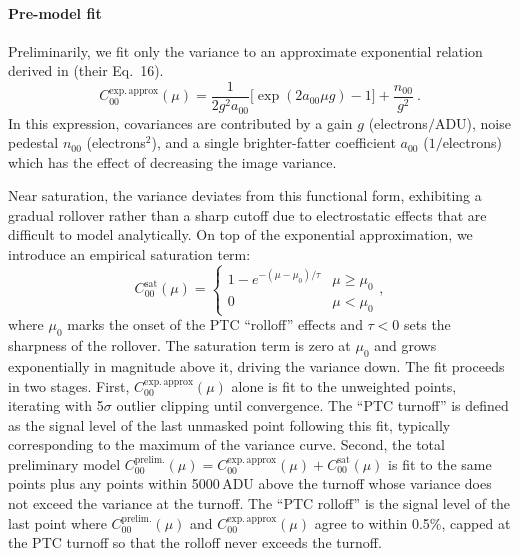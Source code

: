 
\paragraph{Pre-model fit}
Preliminarily, we fit only the variance to an approximate exponential relation derived in \citet{2019A&A...629A..36A} (their Eq.~16).
\begin{equation}
    C_{00}^{\mathrm{exp.\,approx}}(\mu) = \frac{1}{2 g^2 a_{00}}\bigl[\exp(2 a_{00} \mu g) - 1\bigr] + \frac{n_{00}}{g^2}\ .
\end{equation}
In this expression, covariances are contributed by a gain $g$ (electrons$/\mathrm{ADU}$), noise pedestal $n_{00}$ (electrons$^2$), and a single brighter-fatter coefficient $a_{00}$ ($1/$electrons) which has the effect of decreasing the image variance.

Near saturation, the variance deviates from this functional form, exhibiting a gradual rollover rather than a sharp cutoff due to electrostatic effects that are difficult to model analytically.
On top of the exponential approximation, we introduce an empirical saturation term:
\begin{equation}
    C_{00}^{\mathrm{sat}}(\mu) = \left\{
        \begin{array}{ll}
            1 - e^{-(\mu-\mu_0)/\tau} & \mu \ge \mu_0 \\
            0 & \mu < \mu_0
        \end{array}
    \right.,
\end{equation}
where $\mu_0$ marks the onset of the PTC ``rolloff'' effects and $\tau < 0$ sets the sharpness of the rollover.
The saturation term is zero at $\mu_0$ and grows exponentially in magnitude above it, driving the variance down.
The fit proceeds in two stages.
First, $C_{00}^{\mathrm{exp.\,approx}}(\mu)$ alone is fit to the unweighted points, iterating with 5$\sigma$ outlier clipping until convergence.
The ``PTC turnoff'' is defined as the signal level of the last unmasked point following this fit, typically corresponding to the maximum of the variance curve.
Second, the total preliminary model $C_{00}^{\mathrm{prelim.}}(\mu) = C_{00}^{\mathrm{exp.\,approx}}(\mu) + C_{00}^{\mathrm{sat}}(\mu)$ is fit to the same points plus any points within 5000\,ADU above the turnoff whose variance does not exceed the variance at the turnoff.
The ``PTC rolloff'' is the signal level of the last point where $C_{00}^{\mathrm{prelim.}}(\mu)$ and $C_{00}^{\mathrm{exp.\,approx}}(\mu)$ agree to within 0.5\%, capped at the PTC turnoff so that the rolloff never exceeds the turnoff.


